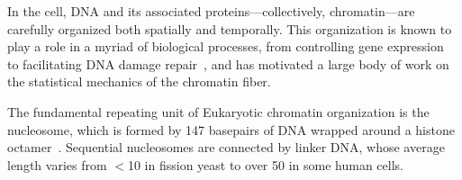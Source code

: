 \documentclass[%
 reprint,
superscriptaddress,
showpacs,preprintnumbers,
 amsmath,amssymb,
 aps,
 prl,
]{revtex4-1}
\begin{document}

In the cell, DNA and its associated proteins---collectively, chromatin---are
    carefully organized both spatially and temporally.
This organization is known to play a role in a myriad of biological processes,
    from controlling gene expression~\cite{hubner2013} to facilitating DNA
    damage repair~\cite{hauer2017,stadler2017}, and has motivated a large body
    of work on the statistical mechanics of the chromatin fiber.

The fundamental repeating unit of Eukaryotic chromatin organization is the
    nucleosome, which is formed by 147 basepairs of DNA wrapped around a
    histone octamer~\cite{cutter2015a}.
Sequential nucleosomes are connected by linker DNA, whose average length varies
    from $<$\SI{10}{\basepair} in fission yeast\cite{givens2012} to over
    \SI{50}{\basepair} in some human cells\cite{schones2008}.
\end{document}

